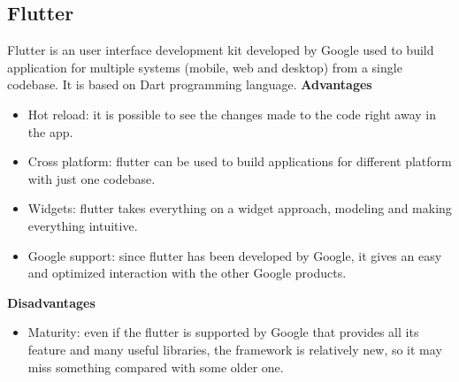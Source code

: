 \documentclass[../ITD.tex]{subfiles}
\begin{document}
    \subsection{Flutter}\label{subsec:flutter}
    Flutter is an user interface development kit developed by Google used to build application for multiple systems (mobile, web and desktop) from a single codebase.
    It is based on Dart programming language.
    \newline
    \textbf{Advantages}
    \begin{itemize}
        \item Hot reload: it is possible to see the changes made to the code right away in the app.
        \item Cross platform: flutter can be used to build applications for different platform with just one codebase.
        \item Widgets: flutter takes everything on a widget approach, modeling and making everything intuitive.
        \item Google support: since flutter has been developed by Google, it gives an easy and optimized interaction with the other Google products.
    \end{itemize}

    \textbf{Disadvantages}
    \begin{itemize}
        \item Maturity: even if the flutter is supported by Google that provides all its feature and many useful libraries, the framework is relatively new, so it may miss something compared with some older one.
    \end{itemize}
\end{document}
